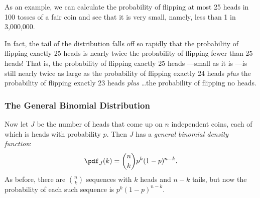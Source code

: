 As an example, we can calculate the probability of flipping at most 25
heads in 100 tosses of a fair coin and see that it is very small, namely,
less than 1 in 3,000,000.

In fact, the tail of the distribution falls off so rapidly that the
probability of flipping exactly 25 heads is nearly twice the probability of flipping
fewer than 25 heads!  That is, the probability of flipping exactly 25
heads ---small as it is ---is still nearly twice as large as the
probability of flipping exactly 24 heads \emph{plus} the probability of
flipping exactly 23 heads \emph{plus} \dots the probability of flipping no
heads.

\subsubsection{The General Binomial Distribution}

Now let $J$ be the number of heads that come up on $n$ independent
coins, each of which is heads with probability $p$.  Then $J$ has a
\textit{general binomial density function}:
%
\[
\pdf_J(k) = \binom{n}{k} p^k (1-p)^{n-k}.
\]
%
As before, there are $\binom{n}{k}$ sequences with $k$ heads and $n -
k$ tails, but now the probability of each such sequence is $p^k
(1-p)^{n-k}$.

